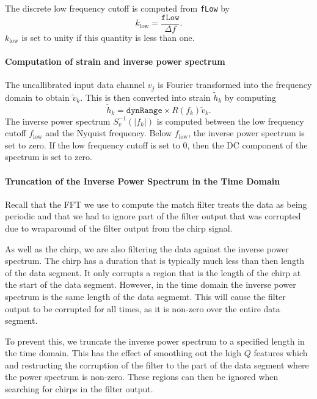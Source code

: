 The discrete low frequency cutoff is computed from \texttt{fLow} by
\begin{equation}
k_{\mathrm{low}} = \frac{\mathtt{fLow}}{\Delta f}.
\end{equation}
$k_{\mathrm{low}}$ is set to unity if this quantity is less than one.

\paragraph*{Computation of strain and inverse power spectrum}

The uncallibrated input data channel $v_j$ is Fourier transformed into the
frequency domain to obtain $\tilde{v}_k$. This is then converted into strain
$\tilde{h}_k$ by computing 
\begin{equation}
\tilde{h}_k = \mathtt{dynRange} \times R(f_k) \tilde{v}_k.
\end{equation}
The inverse power spectrum $S^{-1}_v(|f_k|)$ is computed between the low
frequency cutoff $f_{\mathrm{low}}$ and the Nyquist frequency. Below
$f_{\mathrm{low}}$, the inverse power spectrum is set to zero. If the low
frequency cutoff is set to $0$, then the DC component of the spectrum is
set to zero.

\paragraph*{Truncation of the Inverse Power Spectrum in the Time Domain}

Recall that the FFT we use to compute the match filter treats the data as
being periodic and that we had to ignore part of the filter output that was
corrupted due to wraparound of the filter output from the chirp signal. 

As well as the chirp, we are also filtering the data against the inverse power
spectrum. The chirp has a duration that is typically much less than then
length of the data segment. It only corrupts a region that is the length of
the chirp at the start of the data segment. However, in the time domain the
inverse power spectrum is the same length of the data segmemt. This will cause
the filter output to be corrupted for all times, as it is non-zero over the
entire data segment.

To prevent this, we truncate the inverse power spectrum to a specified length
in the time domain. This has the effect of smoothing out the high $Q$ features
which and restructing the corruption of the filter to the part of the data
segment where the power spectrum is non-zero. These regions can then be
ignored when searching for chirps in the filter output.

